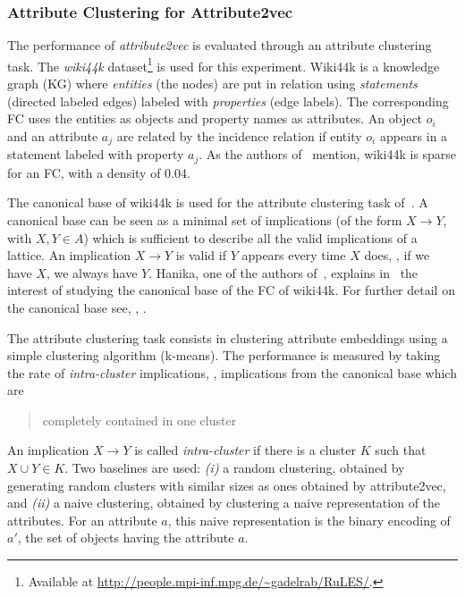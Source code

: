 \subsubsection{Attribute Clustering for Attribute2vec\label{sec:fca2vec-clustering}}
The performance of \textit{attribute2vec} is evaluated through an attribute clustering task.
The \textit{wiki44k} dataset\footnote{Available at \url{http://people.mpi-inf.mpg.de/~gadelrab/RuLES/}.} is used for this experiment. 
Wiki44k is a knowledge graph (KG) where \textit{entities} (the nodes) are put in relation using \textit{statements} (directed labeled edges) labeled with \textit{properties} (edge labels).
The corresponding FC uses the entities as objects and property names as attributes. An object $o_i$ and an attribute $a_j$ are related by the incidence relation if entity $o_i$ appears in a statement labeled with property $a_j$.
As the authors of~\cite{fca2vec:2019:durrschnabel} mention, wiki44k is sparse for an FC, with a density of 0.04.

The canonical base of wiki44k is used for the attribute clustering task of~\cite{fca2vec:2019:durrschnabel}.
A canonical base can be seen as a minimal set of implications (of the form $X\rightarrow Y$, with $X, Y\in A$) which is sufficient to describe all the valid implications of a lattice.
An implication $X\rightarrow Y$ is valid if $Y$ appears every time $X$ does, \ie, if we have $X$, we always have $Y$.
Hanika, one of the authors of~\cite{fca2vec:2019:durrschnabel}, explains in~\cite{wiki44k-tr:2019:hanika} the interest of studying the canonical base of the FC of wiki44k. For further detail on the canonical base see, \eg, \cite{canonical:2016:karell,wiki44k-tr:2019:hanika}.

The attribute clustering task consists in clustering attribute embeddings using a simple clustering algorithm (k-means).
The performance is measured by taking the rate of \textit{intra-cluster} implications, \ie, implications from the canonical base which are \blockcquote{fca2vec:2019:durrschnabel}{completely contained in one cluster}. An implication $X \rightarrow Y$ is called \textit{intra-cluster} if there is a cluster $K$ such that $X \cup Y \in K$.
Two baselines are used: \textit{(i)} a random clustering, obtained by generating random clusters with similar sizes as ones obtained by {attribute2vec}, and \textit{(ii)} a naive clustering, obtained by clustering a naive representation of the attributes. For an attribute $a$, this naive representation is the binary encoding of $a'$, the set of objects having the attribute $a$.

